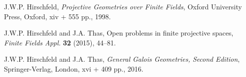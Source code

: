 \documentclass[a4paper]{article}
\begin{document}
\begin{thebibliography}{99}
 J.W.P. Hirschfeld, {\em Projective Geometries over Finite Fields}, 
Oxford University Press, Oxford, xiv + 555  pp., 1998.

 J.W.P. Hirschfeld and J.A. Thas, Open problems in finite projective
spaces, {\em Finite Fields Appl.} {\bf 32} (2015), 44--81.

 J.W.P. Hirschfeld and J.A. Thas, {\em General Galois Geometries, Second
Edition}, Springer-Verlag, London, xvi + 409 pp., 2016.
\end{thebibliography}
\end{document}
